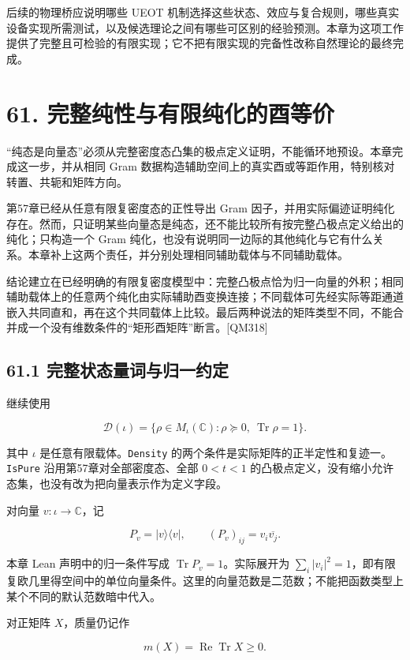 \documentclass[
  11pt,
  oneside]{book}
\begin{document}
后续的物理桥应说明哪些 UEOT
机制选择这些状态、效应与复合规则，哪些真实设备实现所需测试，以及候选理论之间有哪些可区别的经验预测。本章为这项工作提供了完整且可检验的有限实现；它不把有限实现的完备性改称自然理论的最终完成。

\chapter{61. 完整纯性与有限纯化的酉等价}\label{ch-61}\hypertarget{ch-61}{}

``纯态是向量态''必须从完整密度态凸集的极点定义证明，不能循环地预设。本章完成这一步，并从相同
Gram
数据构造辅助空间上的真实酉或等距作用，特别核对转置、共轭和矩阵方向。

第57章已经从任意有限复密度态的正性导出 Gram
因子，并用实际偏迹证明纯化存在。然而，只证明某些向量态是纯态，还不能比较所有按完整凸极点定义给出的纯化；只构造一个
Gram
纯化，也没有说明同一边际的其他纯化与它有什么关系。本章补上这两个责任，并分别处理相同辅助载体与不同辅助载体。

结论建立在已经明确的有限复密度模型中：完整凸极点恰为归一向量的外积；相同辅助载体上的任意两个纯化由实际辅助酉变换连接；不同载体可先经实际等距通道嵌入共同直和，再在这个共同载体上比较。最后两种说法的矩阵类型不同，不能合并成一个没有维数条件的``矩形酉矩阵''断言。{[}QM318{]}

\section{61.1 完整状态量词与归一约定}

继续使用

\[
\mathcal D(\iota)=\{\rho\in M_\iota(\mathbb C):\rho\succeq0,\ \operatorname{Tr}\rho=1\}.
\]

其中 \(\iota\) 是任意有限载体。\texttt{Density}
的两个条件是实际矩阵的正半定性和复迹一。\texttt{Is\allowbreak Pure}
沿用第57章对全部密度态、全部 \(0<t<1\)
的凸极点定义，没有缩小允许态集，也没有改为把向量表示作为定义字段。

对向量 \(v:\iota\to\mathbb C\)，记

\[
P_v=|v\rangle\langle v|,
\qquad (P_v)_{ij}=v_i\overline{v_j}.
\]

本章 Lean 声明中的归一条件写成 \(\operatorname{Tr}P_v=1\)。实际展开为
\(\sum_i|v_i|^2=1\)，即有限复欧几里得空间中的单位向量条件。这里的向量范数是二范数；不能把函数类型上某个不同的默认范数暗中代入。

对正矩阵 \(X\)，质量仍记作

\[
m(X)=\operatorname{Re}\operatorname{Tr}X\ge0.
\]
\end{document}
